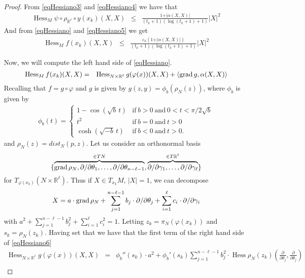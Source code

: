 \documentclass[a4paper]{amsart}
\begin{document}
\begin{proof}
 From \eqref{eqHessiano3} and \eqref{eqHessiano4} we have that 
 \begin{eqnarray}\operatorname{Hess}_{M}\psi\circ \rho_{\mathbb{R}^{\ell}}\circ y(x_{k})(X,X)&\leq & \frac{1+ \vert \alpha(X,X)\vert  }{(t_k+1)(\log (t_k+1)+1)}\vert X\vert^{2}\label{eqHessiano5}
 \end{eqnarray}And from \eqref{eqHessiano} and \eqref{eqHessiano5} we get \begin{eqnarray}\operatorname{Hess}_{M}f(x_{k})(X,X)& \leq & \frac{\varepsilon_{k}(1+ \vert \alpha(X,X)\vert  )}{(t_k+1)(\log (t_k+1)+1)}\vert X\vert^{2}\label{eqHessianoI}
 \end{eqnarray}

Now,  we will compute the left hand side of \eqref{eqHessiano}.
\begin{eqnarray}\operatorname{Hess}_{M}f(x_{k})(X,X) &=& \operatorname{Hess}_{N\times \mathbb{R}^{\ell}} g(\varphi (x))(X,X) + \langle {{{\rm{grad}\,}}} g, \alpha (X,X)\rangle\label{eqHessiano6}
\end{eqnarray}Recalling that $f=g\circ\varphi$ and $g$ is given by  $ g(z,y) = \phi_{b}(\rho_{N}(z)) $, where $\phi_{b}$ is given by
\begin{eqnarray}
\phi_{b}(t) =
\left\{\begin{array}{ll}
1 - \cos(\sqrt{b}\,t) & \mbox{if} \ b > 0 \ \mbox{and} \ 0 < t < \pi/2\sqrt{b} \\
t^2 & \mbox{if} \ b = 0 \ \mbox{and} \ t > 0 \\
\cosh(\sqrt{-b}\,t) & \mbox{if} \ b < 0 \ \mbox{and} \ t > 0.
\end{array}\right.
\end{eqnarray}
and $ \rho_{N}(z) = dist_{N}(p,z) $.  Let us consider an orthonormal basis $$\{\stackrel{\in TN}{\overbrace{ {{{\rm{grad}\,}}} \rho_{N}, \partial/\partial \theta_{1}, \ldots, \partial/\partial \theta_{n-\ell-1}}}, \stackrel{\in T\mathbb{R}^{\ell}}{\overbrace{ \partial/\partial \gamma_1, \ldots, \partial/\partial \gamma_\ell }}\}$$ for $T_{\varphi (x_k)}(N\times \mathbb{R}^{\ell})$. Thus if $X\in T_{x_k}M$, $\vert X\vert =1$, we can decompose $$X=a\cdot {{{\rm{grad}\,}}} \rho_{N}+\sum_{j=1}^{n-\ell-1}b_{j}\cdot \partial/\partial \theta_{j} + \sum_{i=1}^{\ell}c_{i}\cdot \partial/\partial \gamma_i$$  with $a^2+\sum_{j=1}^{n-\ell-1} b_{j}^{2}+ \sum_{i=1}^{\ell} c_{i}^{2}=1$. Letting $z_k=\pi_{N}(\varphi (x_k))$ and $s_k=\rho_{N}(z_k)$. Having set that we have that the first term of the right hand side of \eqref{eqHessiano6}
\begin{eqnarray} \operatorname{Hess}_{N\times \mathbb{R}^{\ell}} g(\varphi (x))(X,X)&=&\!\phi_{b}''(s_k)\cdot   a^2+ \phi_{b}'(s_k)\sum_{j=1}^{n-\ell-1}\!b_j^{2}\cdot \operatorname{Hess} \rho_{N}(z_k)(\frac{\partial}{\partial \theta_{j}},\frac{\partial}{\partial \theta_{j}})\nonumber\\

\end{eqnarray}
\end{proof}
\end{document}
